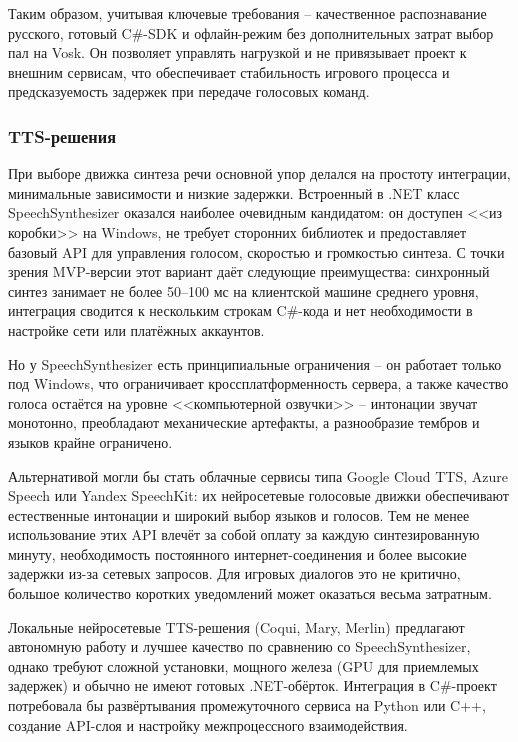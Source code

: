         Таким образом, учитывая ключевые требования -- качественное распознавание русского, готовый C\#-SDK и офлайн-режим без дополнительных затрат выбор пал на Vosk. Он позволяет управлять нагрузкой и не привязывает проект к внешним сервисам, что обеспечивает стабильность игрового процесса и предсказуемость задержек при передаче голосовых команд.

        \subsubsection{TTS-решения}

        При выборе движка синтеза речи основной упор делался на простоту интеграции, минимальные зависимости и низкие задержки. Встроенный в .NET класс SpeechSynthesizer оказался наиболее очевидным кандидатом: он доступен <<из коробки>> на Windows, не требует сторонних библиотек и предоставляет базовый API для управления голосом, скоростью и громкостью синтеза. С точки зрения MVP-версии этот вариант даёт следующие преимущества: синхронный синтез занимает не более 50–100 мс на клиентской машине среднего уровня, интеграция сводится к нескольким строкам C\#-кода и нет необходимости в настройке сети или платёжных аккаунтов.

        Но у SpeechSynthesizer есть принципиальные ограничения -- он работает только под Windows, что ограничивает кроссплатформенность сервера, а также качество голоса остаётся на уровне <<компьютерной озвучки>> -- интонации звучат монотонно, преобладают механические артефакты, а разнообразие тембров и языков крайне ограничено.

        Альтернативой могли бы стать облачные сервисы типа Google Cloud TTS, Azure Speech или Yandex SpeechKit: их нейросетевые голосовые движки обеспечивают естественные интонации и широкий выбор языков и голосов. Тем не менее использование этих API влечёт за собой оплату за каждую синтезированную минуту, необходимость постоянного интернет-соединения и более высокие задержки из-за сетевых запросов. Для игровых диалогов это не критично, большое количество коротких уведомлений может оказаться весьма затратным.

        Локальные нейросетевые TTS-решения (Coqui, Mary, Merlin) предлагают автономную работу и лучшее качество по сравнению со SpeechSynthesizer, однако требуют сложной установки, мощного железа (GPU для приемлемых задержек) и обычно не имеют готовых .NET-обёрток. Интеграция в C\#-проект потребовала бы развёртывания промежуточного сервиса на Python или C++, создание API-слоя и настройку межпроцессного взаимодействия.

